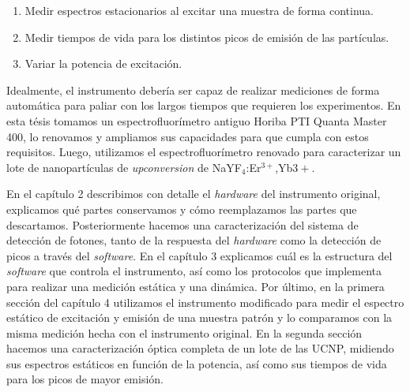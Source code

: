 \begin{enumerate}
    \item Medir espectros estacionarios al excitar una muestra de forma continua.
    \item Medir tiempos de vida para los distintos picos de emisión de las partículas.
    \item Variar la potencia de excitación.
\end{enumerate}

\noindent Idealmente, el instrumento debería ser capaz de realizar mediciones de forma automática para paliar con los largos tiempos que requieren los experimentos.
En esta tésis tomamos un espectrofluorímetro antiguo Horiba PTI Quanta Master 400, lo renovamos y ampliamos sus capacidades para que cumpla con estos requisitos.
Luego, utilizamos el espectrofluorímetro renovado para caracterizar un lote de nanopartículas de \textit{upconversion} de NaYF$_4$:Er$^{3+}$,Yb${3+}$.

En el capítulo 2 describimos con detalle el \textit{hardware} del instrumento original, explicamos qué partes conservamos y cómo reemplazamos las partes que descartamos.
Posteriormente hacemos una caracterización del sistema de detección de fotones, tanto de la respuesta del \textit{hardware} como la detección de picos a través del \textit{software}.
En el capítulo 3 explicamos cuál es la estructura del \textit{software} que controla el instrumento, así como los protocolos que implementa para realizar una medición estática y una dinámica.
Por último, en la primera sección del capítulo 4 utilizamos el instrumento modificado para medir el espectro estático de excitación y emisión de una muestra patrón y lo comparamos con la misma medición hecha con el instrumento original.
En la segunda sección hacemos una caracterización óptica completa de un lote de las UCNP, midiendo sus espectros estáticos en función de la potencia, así como sus tiempos de vida para los picos de mayor emisión.


